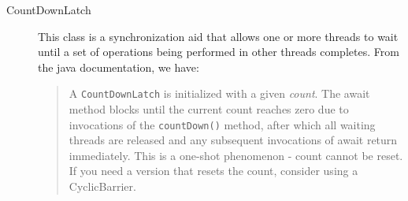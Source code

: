 \documentclass{latex/classes/thesis}
\begin{document}
\begin{description}
\item[{CountDownLatch}] This class is a synchronization aid that allows one or
more threads to wait until a set of operations being performed in other
threads completes. From the java documentation, we have:

\begin{quote}
A \texttt{CountDownLatch} is initialized with a given \emph{count}. The await method
blocks until the current count reaches zero due to invocations of the
\texttt{countDown()} method, after which all waiting threads are released and any
subsequent invocations of await return immediately. This is a one-shot
phenomenon - count cannot be reset. If you need a version that resets the
count, consider using a CyclicBarrier.
\end{quote}
\end{description}
\end{document}

